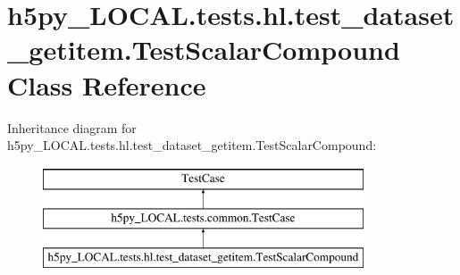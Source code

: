 \hypertarget{classh5py__LOCAL_1_1tests_1_1hl_1_1test__dataset__getitem_1_1TestScalarCompound}{}\section{h5py\+\_\+\+L\+O\+C\+A\+L.\+tests.\+hl.\+test\+\_\+dataset\+\_\+getitem.\+Test\+Scalar\+Compound Class Reference}
\label{classh5py__LOCAL_1_1tests_1_1hl_1_1test__dataset__getitem_1_1TestScalarCompound}
Inheritance diagram for h5py\+\_\+\+L\+O\+C\+A\+L.\+tests.\+hl.\+test\+\_\+dataset\+\_\+getitem.\+Test\+Scalar\+Compound\+:\begin{figure}[H]
\begin{center}
\leavevmode
\includegraphics[height=3.000000cm]{classh5py__LOCAL_1_1tests_1_1hl_1_1test__dataset__getitem_1_1TestScalarCompound}
\end{center}
\end{figure}
